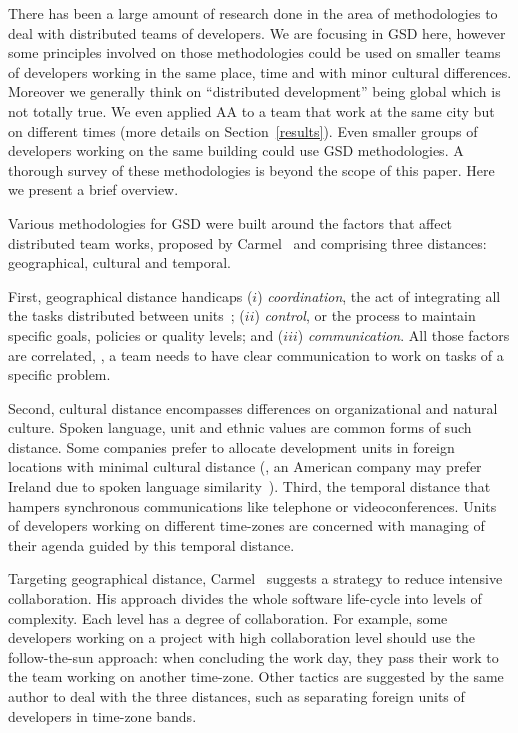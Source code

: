 \documentclass[letterpaper]{article}
\newcommand{\indraftnote}[1]{\textcolor{blue}{\texttt{\footnotesize[#1]}}}
\newcommand{\todo}[1]{\indraftnote{todo: #1}}
\begin{document}


There has been a large amount of research done in the area of
methodologies to deal with distributed teams of developers. We are
focusing in GSD here, however some principles involved on those
methodologies could be used on smaller teams of developers working in
the same place, time and with minor cultural differences. Moreover we
generally think on ``distributed development'' being global which is
not totally true. We even applied AA to a team that work at the same
city but on different times (more details on
Section~\ref{results}). Even smaller groups of developers working on
the same building could use GSD methodologies. A thorough survey of
these methodologies is beyond the scope of this paper. Here we present
a brief overview.

Various methodologies for GSD were built around the factors that
affect distributed team works, proposed by Carmel~\cite{carmel1999}
and comprising three distances: geographical, cultural and
temporal. 

First, geographical distance handicaps ($i$) \emph{coordination}, the act of
integrating all the tasks distributed between units~\cite{carmel2001}; ($ii$)
\emph{control}, or the process to maintain specific goals, policies or quality
levels; and ($iii$) \emph{communication}. All those factors are correlated, \eg,
a team needs to have clear communication to work on tasks of a specific problem.  

Second, cultural distance encompasses differences on organizational and
natural culture. Spoken language, unit and ethnic values are common
forms of such distance. Some companies prefer to allocate development
units in foreign locations with minimal cultural distance (\eg, an
American company may prefer Ireland due to spoken language
similarity~\cite{carmel2001}). Third, the temporal distance that
hampers synchronous communications like telephone or
videoconferences. Units of developers working on different time-zones
are concerned with managing of their agenda guided by this temporal
distance.

Targeting geographical distance, Carmel~\cite{carmel2001} suggests a
strategy to reduce intensive collaboration. His approach divides the
whole software life-cycle into levels of complexity. Each level has a
degree of collaboration. For example, some developers working on a
project with high collaboration level should use the follow-the-sun
approach: when concluding the work day, they pass their work to the
team working on another time-zone. Other tactics are suggested by the
same author to deal with the three distances, such as separating foreign
units of developers in time-zone bands.
\end{document}
